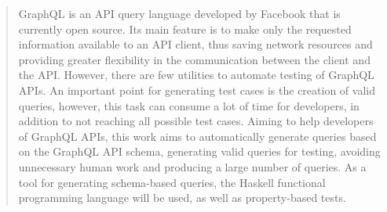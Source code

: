\begin{abstract}
GraphQL is an API query language developed by Facebook that is currently open source. Its main feature is to make only the requested information available to an API client, thus saving network resources and providing greater flexibility in the communication between the client and the API. However, there are few utilities to automate testing of GraphQL APIs. An important point for generating test cases is the creation of valid queries, however, this task can consume a lot of time for developers, in addition to not reaching all possible test cases. Aiming to help developers of GraphQL APIs, this work aims to automatically generate queries based on the GraphQL API schema, generating valid queries for testing, avoiding unnecessary human work and producing a large number of queries. As a tool for generating schema-based queries, the Haskell functional programming language will be used, as well as property-based tests.
\end{abstract}
